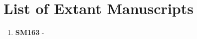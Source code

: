 \chapter*{List of Extant Manuscripts}
\label{ch:list_manuscripts}
\begin{enumerate}
    \item \textbf{SM163} - 
\end{enumerate}